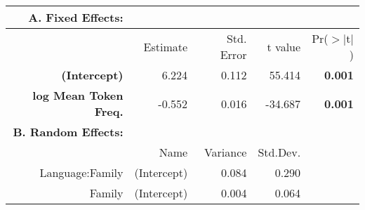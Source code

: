 \begin{tabular}{rrrrr}
 {\bf A. Fixed Effects:} \\
\hline
 & Estimate & Std. Error & t value & Pr($>$$|$t$|$) \\ 
  \hline
{ \bf (Intercept)} & 6.224 & 0.112 & 55.414 & {\bf 0.001} \\ 
  {\bf log Mean Token Freq.} & -0.552 & 0.016 & -34.687 & {\bf 0.001} \\ 

\hline \hline
{\bf B. Random Effects:} \\
\hline
& Name & Variance & Std.Dev. \\
\hline
Language:Family & (Intercept) & 0.084 & 0.290 \\
Family & (Intercept) & 0.004 & 0.064 \\
\end{tabular}
